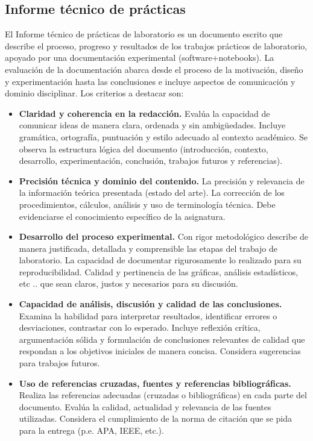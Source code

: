 \documentclass[a4paper, 11pt]{article}
\begin{document}
\subsection{Informe técnico de prácticas}

El Informe técnico de prácticas de laboratorio es un documento escrito que describe el proceso, progreso y resultados de los trabajos prácticos de laboratorio, apoyado por una documentación experimental (software+notebooks).  La evaluación de la documentación abarca desde el proceso de la motivación, diseño y experimentación hasta las conclusiones e incluye aspectos de comunicación y dominio disciplinar. Los criterios a destacar son:

\begin{itemize}
\item 
\textbf{Claridad y coherencia en la redacción.} Evalúa la capacidad de comunicar ideas de manera clara, ordenada y sin ambigüedades. Incluye gramática, ortografía, puntuación y estilo adecuado al contexto académico. Se observa la estructura lógica del documento (introducción, contexto, desarrollo, experimentación, conclusión, trabajos futuros y referencias).

\item 
\textbf{Precisión técnica y dominio del contenido.} La precisión y relevancia de la información teórica presentada (estado del arte). La corrección de los procedimientos, cálculos, análisis y uso de terminología técnica. Debe evidenciarse el conocimiento específico de la asignatura.

\item 
\textbf{Desarrollo del proceso experimental.} Con rigor metodológico describe de manera justificada, detallada y comprensible las etapas del trabajo de laboratorio. La capacidad de documentar rigurosamente lo realizado para su reproducibilidad. Calidad y pertinencia de las gráficas, análisis estadísticos, etc .. que sean claros, justos y necesarios para su discusión.

\item 
\textbf{Capacidad de análisis, discusión y calidad de las conclusiones.} Examina la habilidad para interpretar resultados, identificar errores o desviaciones, contrastar con lo esperado. Incluye reflexión crítica, argumentación sólida y formulación de conclusiones relevantes de calidad que respondan a los objetivos iniciales de manera concisa. Considera sugerencias para trabajos futuros.

\item 
\textbf{Uso de referencias cruzadas, fuentes y referencias bibliográficas.} Realiza las referencias adecuadas (cruzadas o bibliográficas) en cada parte del documento. Evalúa la calidad, actualidad y relevancia de las fuentes utilizadas. Considera el cumplimiento de la norma de citación que se pida para la entrega (p.e. APA, IEEE, etc.).
\end{itemize}
\end{document}
